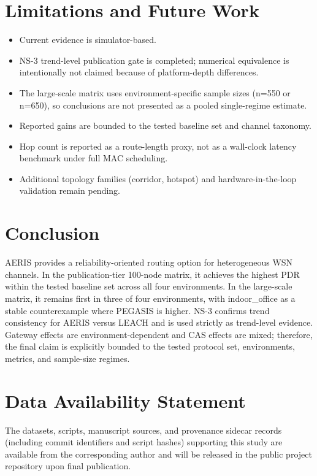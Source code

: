 ﻿\documentclass[sensors,article,submit,moreauthors,pdftex]{Definitions/mdpi}
\begin{document}
\section{Limitations and Future Work}
\begin{itemize}
\item Current evidence is simulator-based.
\item NS-3 trend-level publication gate is completed; numerical equivalence is intentionally not claimed because of platform-depth differences.
\item The large-scale matrix uses environment-specific sample sizes (n=550 or n=650), so conclusions are not presented as a pooled single-regime estimate.
\item Reported gains are bounded to the tested baseline set and channel taxonomy.
\item Hop count is reported as a route-length proxy, not as a wall-clock latency benchmark under full MAC scheduling.
\item Additional topology families (corridor, hotspot) and hardware-in-the-loop validation remain pending.
\end{itemize}

\section{Conclusion}
AERIS provides a reliability-oriented routing option for heterogeneous WSN channels. In the publication-tier 100-node matrix, it achieves the highest PDR within the tested baseline set across all four environments. In the large-scale matrix, it remains first in three of four environments, with indoor\_office as a stable counterexample where PEGASIS is higher. NS-3 confirms trend consistency for AERIS versus LEACH and is used strictly as trend-level evidence. Gateway effects are environment-dependent and CAS effects are mixed; therefore, the final claim is explicitly bounded to the tested protocol set, environments, metrics, and sample-size regimes.

\section*{Data Availability Statement}
The datasets, scripts, manuscript sources, and provenance sidecar records (including commit identifiers and script hashes) supporting this study are available from the corresponding author and will be released in the public project repository upon final publication.


\end{document}
